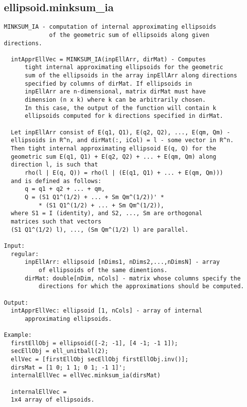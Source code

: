 \subsection{\texorpdfstring{ellipsoid.minksum\_ia}{minksum\_ia}}\label{method:ellipsoid.minksumia}
\begin{verbatim}
MINKSUM_IA - computation of internal approximating ellipsoids
             of the geometric sum of ellipsoids along given directions.

  intApprEllVec = MINKSUM_IA(inpEllArr, dirMat) - Computes
      tight internal approximating ellipsoids for the geometric
      sum of the ellipsoids in the array inpEllArr along directions
      specified by columns of dirMat. If ellipsoids in
      inpEllArr are n-dimensional, matrix dirMat must have
      dimension (n x k) where k can be arbitrarily chosen.
      In this case, the output of the function will contain k
      ellipsoids computed for k directions specified in dirMat.

  Let inpEllArr consist of E(q1, Q1), E(q2, Q2), ..., E(qm, Qm) -
  ellipsoids in R^n, and dirMat(:, iCol) = l - some vector in R^n.
  Then tight internal approximating ellipsoid E(q, Q) for the
  geometric sum E(q1, Q1) + E(q2, Q2) + ... + E(qm, Qm) along
  direction l, is such that
      rho(l | E(q, Q)) = rho(l | (E(q1, Q1) + ... + E(qm, Qm)))
  and is defined as follows:
      q = q1 + q2 + ... + qm,
      Q = (S1 Q1^(1/2) + ... + Sm Qm^(1/2))' *
          * (S1 Q1^(1/2) + ... + Sm Qm^(1/2)),
  where S1 = I (identity), and S2, ..., Sm are orthogonal
  matrices such that vectors
  (S1 Q1^(1/2) l), ..., (Sm Qm^(1/2) l) are parallel.

Input:
  regular:
      inpEllArr: ellipsoid [nDims1, nDims2,...,nDimsN] - array
          of ellipsoids of the same dimentions.
      dirMat: double[nDim, nCols] - matrix whose columns specify the
          directions for which the approximations should be computed.

Output:
  intApprEllVec: ellipsoid [1, nCols] - array of internal
      approximating ellipsoids.

Example:
  firstEllObj = ellipsoid([-2; -1], [4 -1; -1 1]);
  secEllObj = ell_unitball(2);
  ellVec = [firstEllObj secEllObj firstEllObj.inv()];
  dirsMat = [1 0; 1 1; 0 1; -1 1]';
  internalEllVec = ellVec.minksum_ia(dirsMat)

  internalEllVec =
  1x4 array of ellipsoids.
\end{verbatim}

